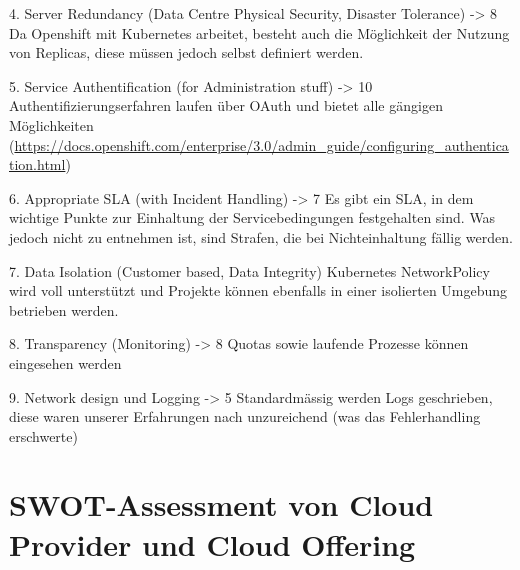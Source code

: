 \documentclass[12pt,a4paper]{article}
\begin{document}
4. Server Redundancy (Data Centre Physical Security, Disaster Tolerance) -> 8
Da Openshift mit Kubernetes arbeitet, besteht auch die Möglichkeit der Nutzung von Replicas, diese müssen jedoch selbst definiert werden.


5. Service Authentification (for Administration stuff) -> 10
Authentifizierungserfahren laufen über OAuth und bietet alle gängigen Möglichkeiten (\url{https://docs.openshift.com/enterprise/3.0/admin_guide/configuring_authentication.html})


6. Appropriate SLA (with Incident Handling) -> 7
Es gibt ein SLA, in dem wichtige Punkte zur Einhaltung der Servicebedingungen festgehalten sind. Was jedoch nicht zu entnehmen ist, sind Strafen, die bei Nichteinhaltung fällig werden.


7. Data Isolation (Customer based, Data Integrity)
Kubernetes NetworkPolicy wird voll unterstützt und Projekte können ebenfalls in einer isolierten Umgebung betrieben werden.


8. Transparency (Monitoring) -> 8
Quotas sowie laufende Prozesse können eingesehen werden


9. Network design und Logging -> 5
Standardmässig werden Logs geschrieben, diese waren unserer Erfahrungen nach unzureichend (was das Fehlerhandling erschwerte)


\section{SWOT-Assessment von Cloud Provider und Cloud Offering}
\end{document}
